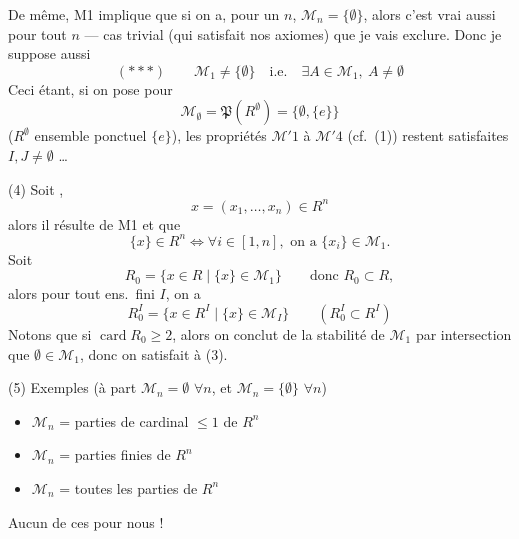 \documentclass[11pt,a4paper]{article}
\begin{document}
\struck{(\ill{}) \ill{} \ill{}}
De même, M1 implique que si on a, pour un $n$, 
$\mathcal{M}_n = \{\emptyset\}$, alors c'est vrai aussi pour tout $n$ ---
cas trivial (qui satisfait nos axiomes) que je vais exclure. Donc je suppose
aussi
\[ (***) \qquad \mathcal{M}_1 \neq \{\emptyset\} \quad \text{i.e.} \quad
\exists A \in \mathcal{M}_1,\ A \neq \emptyset \]
Ceci étant, si on pose pour 
\[ \mathcal{M}_\emptyset = \mathfrak{P}(R^\emptyset) = \{\emptyset,
\{e\}\} \]
($R^\emptyset$ ensemble ponctuel $\{e\}$), les propriétés $\mathcal{M}'1$ à
$\mathcal{M}'4$ (cf.\ (1)) restent satisfaites \ill{} \struck{\ill{}}
$I, J \neq \emptyset$ \ldots{}

(4) Soit ,
\[ x = (x_1, \dots, x_n) \in R^n \]
alors il résulte de M1 et  que
\[ \{x\} \in R^n \iff \forall i \in [1,n], \text{ on a } \{x_i\} \in
\mathcal{M}_1 . \]
Soit
\[ R_0 = \{x \in R \mid \{x\} \in \mathcal{M}_1\} \qquad \text{donc } R_0
\subset R , \]
alors pour tout ens.\ fini $I$, on a
\[ R_0^I = \{x \in R^I \mid \{x\} \in \mathcal{M}_I\} \qquad (R_0^I \subset
R^I) \]
Notons que si  $\operatorname{card} R_0
\geqslant 2$, alors on conclut de la stabilité de $\mathcal{M}_1$ par
intersection que $\emptyset \in \mathcal{M}_1$, donc on satisfait à (3).

(5) Exemples (à part $\mathcal{M}_n = \emptyset$ $\forall n$, et
$\mathcal{M}_n = \{\emptyset\}$ $\forall n$)

\begin{itemize}
  \item[a)] $\mathcal{M}_n$ = parties de cardinal $\leqslant 1$ de $R^n$
  \item[b)] $\mathcal{M}_n$ = parties finies de \ill{} $R^n$
  \item[c)] $\mathcal{M}_n$ = toutes les \ill{} parties de $R^n$
\end{itemize}

Aucun de ces \ill{} \ill{} pour nous !
\end{document}
